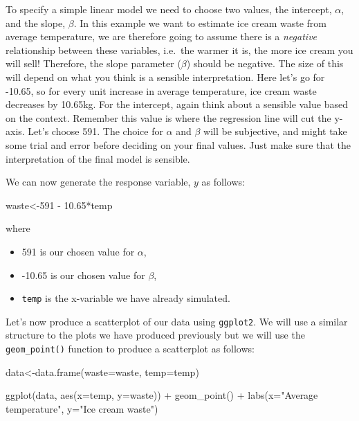\documentclass[
]{book}
\newenvironment{Shaded}{\begin{snugshade}}{\end{snugshade}}
\newcommand{\AttributeTok}[1]{\textcolor[rgb]{0.77,0.63,0.00}{#1}}
\newcommand{\DecValTok}[1]{\textcolor[rgb]{0.00,0.00,0.81}{#1}}
\newcommand{\FloatTok}[1]{\textcolor[rgb]{0.00,0.00,0.81}{#1}}
\newcommand{\FunctionTok}[1]{\textcolor[rgb]{0.00,0.00,0.00}{#1}}
\newcommand{\NormalTok}[1]{#1}
\newcommand{\OtherTok}[1]{\textcolor[rgb]{0.56,0.35,0.01}{#1}}
\newcommand{\SpecialCharTok}[1]{\textcolor[rgb]{0.00,0.00,0.00}{#1}}
\newcommand{\StringTok}[1]{\textcolor[rgb]{0.31,0.60,0.02}{#1}}
\providecommand{\tightlist}{%
  \setlength{\itemsep}{0pt}\setlength{\parskip}{0pt}}
\begin{document}
To specify a simple linear model we need to choose two values, the intercept, \(\alpha\), and the slope, \(\beta\). In this example we want to estimate ice cream waste from average temperature, we are therefore going to assume there is a \emph{negative} relationship between these variables, i.e.~the warmer it is, the more ice cream you will sell! Therefore, the slope parameter (\(\beta\)) should be negative. The size of this will depend on what you think is a sensible interpretation. Here let's go for -10.65, so for every unit increase in average temperature, ice cream waste decreases by 10.65kg. For the intercept, again think about a sensible value based on the context. Remember this value is where the regression line will cut the y-axis. Let's choose 591. The choice for \(\alpha\) and \(\beta\) will be subjective, and might take some trial and error before deciding on your final values. Just make sure that the interpretation of the final model is sensible.

We can now generate the response variable, \(y\) as follows:

\begin{Shaded}
\begin{Highlighting}[]
\NormalTok{waste}\OtherTok{\textless{}{-}}\DecValTok{591} \SpecialCharTok{{-}} \FloatTok{10.65}\SpecialCharTok{*}\NormalTok{temp}
\end{Highlighting}
\end{Shaded}

where

\begin{itemize}
\tightlist
\item
  591 is our chosen value for \(\alpha\),
\item
  -10.65 is our chosen value for \(\beta\),
\item
  \texttt{temp} is the x-variable we have already simulated.
\end{itemize}

Let's now produce a scatterplot of our data using \texttt{ggplot2}. We will use a similar structure to the plots we have produced previously but we will use the \texttt{geom\_point()} function to produce a scatterplot as follows:

\begin{Shaded}
\begin{Highlighting}[]
\NormalTok{data}\OtherTok{\textless{}{-}}\FunctionTok{data.frame}\NormalTok{(}\AttributeTok{waste=}\NormalTok{waste, }\AttributeTok{temp=}\NormalTok{temp)}

\FunctionTok{ggplot}\NormalTok{(data, }\FunctionTok{aes}\NormalTok{(}\AttributeTok{x=}\NormalTok{temp, }\AttributeTok{y=}\NormalTok{waste)) }\SpecialCharTok{+} 
  \FunctionTok{geom\_point}\NormalTok{() }\SpecialCharTok{+} 
  \FunctionTok{labs}\NormalTok{(}\AttributeTok{x=}\StringTok{"Average temperature"}\NormalTok{, }\AttributeTok{y=}\StringTok{"Ice cream waste"}\NormalTok{)}
\end{Highlighting}
\end{Shaded}
\end{document}
